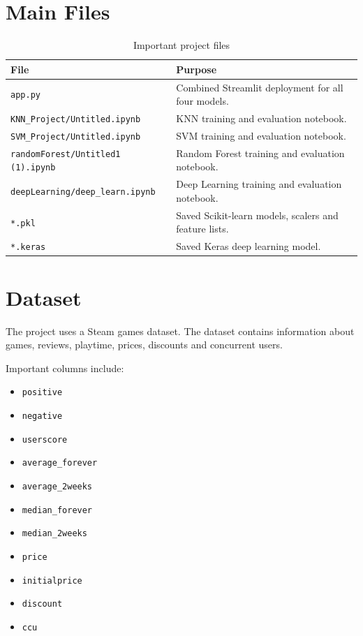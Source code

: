 \documentclass[12pt,a4paper]{article}
\begin{document}
\section{Main Files}

\begin{table}[h]
\centering
\begin{tabular}{p{5cm} p{9cm}}
\toprule
\textbf{File} & \textbf{Purpose} \\
\midrule
\texttt{app.py} & Combined Streamlit deployment for all four models. \\
\texttt{KNN\_Project/Untitled.ipynb} & KNN training and evaluation notebook. \\
\texttt{SVM\_Project/Untitled.ipynb} & SVM training and evaluation notebook. \\
\texttt{randomForest/Untitled1 (1).ipynb} & Random Forest training and evaluation notebook. \\
\texttt{deepLearning/deep\_learn.ipynb} & Deep Learning training and evaluation notebook. \\
\texttt{*.pkl} & Saved Scikit-learn models, scalers and feature lists. \\
\texttt{*.keras} & Saved Keras deep learning model. \\
\bottomrule
\end{tabular}
\caption{Important project files}
\end{table}

\section{Dataset}

The project uses a Steam games dataset. The dataset contains information about games, reviews, playtime, prices, discounts and concurrent users.

Important columns include:

\begin{itemize}[noitemsep]
    \item \texttt{positive}
    \item \texttt{negative}
    \item \texttt{userscore}
    \item \texttt{average\_forever}
    \item \texttt{average\_2weeks}
    \item \texttt{median\_forever}
    \item \texttt{median\_2weeks}
    \item \texttt{price}
    \item \texttt{initialprice}
    \item \texttt{discount}
    \item \texttt{ccu}
\end{itemize}
\end{document}
